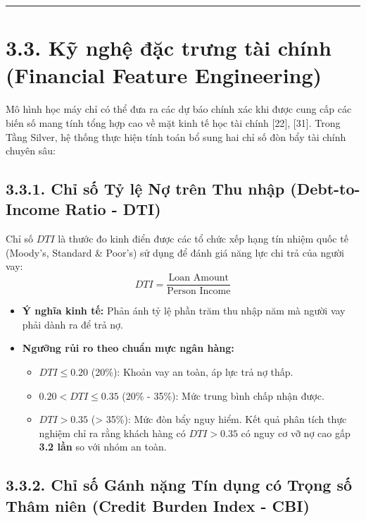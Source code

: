 \documentclass[
  13pt,
  a4paper,
]{report}
\providecommand{\tightlist}{%
  \setlength{\itemsep}{0pt}\setlength{\parskip}{0pt}}
\begin{document}
\begin{center}\rule{0.5\linewidth}{0.5pt}\end{center}

\section{3.3. Kỹ nghệ đặc trưng tài chính (Financial Feature
Engineering)}\label{kux1ef9-nghux1ec7-ux111ux1eb7c-trux1b0ng-tuxe0i-chuxednh-financial-feature-engineering}

Mô hình học máy chỉ có thể đưa ra các dự báo chính xác khi được cung cấp
các biến số mang tính tổng hợp cao về mặt kinh tế học tài chính
{[}22{]}, {[}31{]}. Trong Tầng Silver, hệ thống thực hiện tính toán bổ
sung hai chỉ số đòn bẩy tài chính chuyên sâu:

\subsection{3.3.1. Chỉ số Tỷ lệ Nợ trên Thu nhập (Debt-to-Income Ratio -
DTI)}\label{chux1ec9-sux1ed1-tux1ef7-lux1ec7-nux1ee3-truxean-thu-nhux1eadp-debt-to-income-ratio---dti}

Chỉ số \(DTI\) là thước đo kinh điển được các tổ chức xếp hạng tín nhiệm
quốc tế (Moody's, Standard \& Poor's) sử dụng để đánh giá năng lực chi
trả của người vay:
\[DTI = \frac{\text{Loan Amount}}{\text{Person Income}}\]

\begin{itemize}
\tightlist
\item
  \textbf{Ý nghĩa kinh tế:} Phản ánh tỷ lệ phần trăm thu nhập năm mà
  người vay phải dành ra để trả nợ.
\item
  \textbf{Ngưỡng rủi ro theo chuẩn mực ngân hàng:}

  \begin{itemize}
  \tightlist
  \item
    \(DTI \le 0.20\) (20\%): Khoản vay an toàn, áp lực trả nợ thấp.
  \item
    \(0.20 < DTI \le 0.35\) (20\% - 35\%): Mức trung bình chấp nhận
    được.
  \item
    \(DTI > 0.35\) (\textgreater{} 35\%): Mức đòn bẩy nguy hiểm. Kết quả
    phân tích thực nghiệm chỉ ra rằng khách hàng có \(DTI > 0.35\) có
    nguy cơ vỡ nợ cao gấp \textbf{3.2 lần} so với nhóm an toàn.
  \end{itemize}
\end{itemize}

\subsection{3.3.2. Chỉ số Gánh nặng Tín dụng có Trọng số Thâm niên
(Credit Burden Index -
CBI)}\label{chux1ec9-sux1ed1-guxe1nh-nux1eb7ng-tuxedn-dux1ee5ng-cuxf3-trux1ecdng-sux1ed1-thuxe2m-niuxean-credit-burden-index---cbi}
\end{document}
